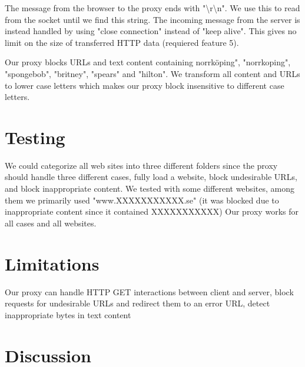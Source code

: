 \documentclass[10pt]{article}
\begin{document}
The message from the browser to the proxy ends with
"\textbackslash r\textbackslash n". We use this to read from the socket until
we find this string. The incoming message from the server is instead handled by
using "close connection" instead of "keep alive". This gives no limit on the
size of transferred HTTP data (requiered feature 5).

Our proxy blocks URLs and text content containing norrköping", "norrkoping",
"spongebob", "britney", "spears" and "hilton". We transform all content and
URLs to lower case letters which makes our proxy block insensitive to different
case letters.

\section{Testing}
We could categorize all web sites into three different folders since the
proxy should handle three different cases, fully load a website,
block undesirable URLs, and block inappropriate content. We tested with some
different websites, among them we primarily used "www.XXXXXXXXXXX.se"
(it was blocked due to inappropriate content since it contained XXXXXXXXXXX)
Our proxy works for all cases and all websites.

\section{Limitations}
Our proxy can handle HTTP GET interactions between client and server,
block requests for undesirable URLs and redirect them to an error URL,
detect inappropriate bytes in text content

\section{Discussion}
\end{document}
